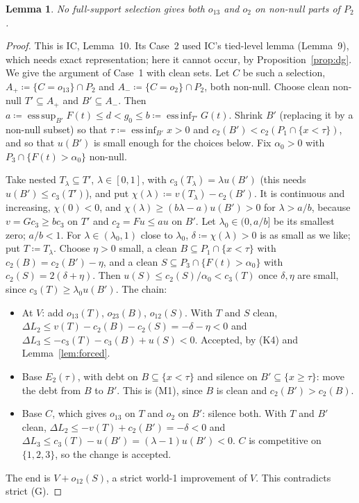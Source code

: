 \documentclass[11pt]{article}
\newtheorem{lemma}[theorem]{Lemma}
\theoremstyle{definition}\newtheorem{definition}[theorem]{Definition}
\theoremstyle{remark}\newtheorem{remark}[theorem]{Remark}
\newcommand{\esssup}{\operatorname*{ess\,sup}}
\newcommand{\essinf}{\operatorname*{ess\,inf}}
\begin{document}
\begin{lemma}\label{lem:noboth}
No full-support selection gives both $o_{13}$ and $o_2$ on non-null parts of
$P_2$.
\end{lemma}
\begin{proof}
This is IC, Lemma~10. Its Case~2 used IC's tied-level lemma (Lemma~9), which
needs exact representation; here it cannot occur, by
Proposition~\ref{prop:dg}. We give the argument of Case~1 with clean sets.
Let $C$ be such a selection, $A_+\coloneqq\{C=o_{13}\}\cap P_2$ and
$A_-\coloneqq\{C=o_2\}\cap P_2$, both non-null. Choose clean non-null
$T'\subseteq A_+$ and $B'\subseteq A_-$. Then
$a\coloneqq\esssup_{B'}F(t)\le d<g_0\le b\coloneqq\essinf_{T'}G(t)$. Shrink
$B'$ (replacing it by a non-null subset) so that $\tau\coloneqq\essinf_{B'}x>0$
and
$c_2(B')<c_2(P_1\cap\{x<\tau\})$, and so that $u(B')$ is small enough for the
choices below. Fix $\alpha_0>0$ with $P_3\cap\{F(t)>\alpha_0\}$ non-null.

Take nested $T_\lambda\subseteq T'$, $\lambda\in[0,1]$, with
$c_3(T_\lambda)=\lambda u(B')$ (this needs $u(B')\le c_3(T')$), and
put $\chi(\lambda)\coloneqq v(T_\lambda)-c_2(B')$. It is continuous and
increasing, $\chi(0)<0$, and $\chi(\lambda)\ge(b\lambda-a)u(B')>0$ for
$\lambda>a/b$, because $v=Gc_3\ge bc_3$ on $T'$ and $c_2=Fu\le au$ on $B'$.
Let $\lambda_0\in(0,a/b]$ be its smallest zero; $a/b<1$. For $\lambda\in
(\lambda_0,1)$ close to $\lambda_0$, $\delta\coloneqq\chi(\lambda)>0$ is as
small as we like; put $T\coloneqq T_\lambda$. Choose $\eta>0$ small, a clean
$B\subseteq P_1\cap\{x<\tau\}$ with $c_2(B)=c_2(B')-\eta$, and a clean
$S\subseteq P_3\cap\{F(t)>\alpha_0\}$ with $c_2(S)=2(\delta+\eta)$. Then
$u(S)\le c_2(S)/\alpha_0<c_3(T)$ once $\delta,\eta$ are small, since
$c_3(T)\ge\lambda_0u(B')$. The chain:
\begin{itemize}[leftmargin=*,itemsep=2pt]
\item At $V$: add $o_{13}(T)$, $o_{23}(B)$, $o_{12}(S)$. With $T$ and $S$
clean, $\Delta L_2\le v(T)-c_2(B)-c_2(S)=-\delta-\eta<0$ and $\Delta
L_3\le-c_3(T)-c_3(B)+u(S)<0$. Accepted, by (K4) and Lemma~\ref{lem:forced}.
\item Base $E_2(\tau)$, with debt on $B\subseteq\{x<\tau\}$ and silence on
$B'\subseteq\{x\ge\tau\}$: move the debt from $B$ to $B'$. This is (M1), since
$B$ is clean and $c_2(B')>c_2(B)$.
\item Base $C$, which gives $o_{13}$ on $T$ and $o_2$ on $B'$: silence both.
With $T$ and $B'$ clean, $\Delta L_2\le-v(T)+c_2(B')=-\delta<0$ and $\Delta
L_3\le c_3(T)-u(B')=(\lambda-1)u(B')<0$. $C$ is competitive on $\{1,2,3\}$,
so the change is accepted.
\end{itemize}
The end is $V+o_{12}(S)$, a strict world-1 improvement of $V$. This
contradicts strict (G).
\end{proof}
\end{document}
